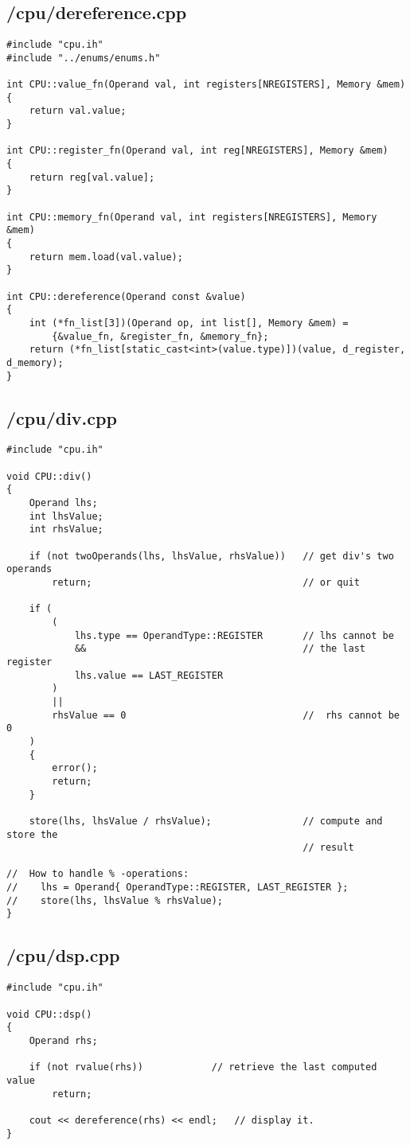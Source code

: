 \documentclass{article}
\begin{document}
\subsection*{/cpu/dereference.cpp}
\begin{verbatim}
#include "cpu.ih"
#include "../enums/enums.h"

int CPU::value_fn(Operand val, int registers[NREGISTERS], Memory &mem)
{
    return val.value;
}

int CPU::register_fn(Operand val, int reg[NREGISTERS], Memory &mem)
{
    return reg[val.value];
}

int CPU::memory_fn(Operand val, int registers[NREGISTERS], Memory &mem)
{
    return mem.load(val.value);
}

int CPU::dereference(Operand const &value)
{
    int (*fn_list[3])(Operand op, int list[], Memory &mem) = 
        {&value_fn, &register_fn, &memory_fn};
    return (*fn_list[static_cast<int>(value.type)])(value, d_register, d_memory);
}

\end{verbatim}
\subsection*{/cpu/div.cpp}
\begin{verbatim}
#include "cpu.ih"

void CPU::div()
{
    Operand lhs;
    int lhsValue;
    int rhsValue;

    if (not twoOperands(lhs, lhsValue, rhsValue))   // get div's two operands
        return;                                     // or quit

    if (
        (
            lhs.type == OperandType::REGISTER       // lhs cannot be
            &&                                      // the last register
            lhs.value == LAST_REGISTER
        )
        ||
        rhsValue == 0                               //  rhs cannot be 0
    )
    {
        error();
        return;
    }

    store(lhs, lhsValue / rhsValue);                // compute and store the
                                                    // result

//  How to handle % -operations:
//    lhs = Operand{ OperandType::REGISTER, LAST_REGISTER };
//    store(lhs, lhsValue % rhsValue);
}
\end{verbatim}
\subsection*{/cpu/dsp.cpp}
\begin{verbatim}
#include "cpu.ih"

void CPU::dsp()
{
    Operand rhs;

    if (not rvalue(rhs))            // retrieve the last computed value
        return;

    cout << dereference(rhs) << endl;   // display it.
}
\end{verbatim}
\end{document}
